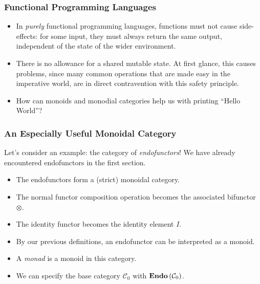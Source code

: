 \documentclass{beamer}
\numberwithin{figure}{section}
\DeclareMathOperator{\catendo}{\text{\textbf{Endo}}}
\begin{document}
\begin{frame}
        \frametitle{Functional Programming Languages}
        \begin{itemize}[<+->]
                \item In \textit{purely} functional programming languages,
                        functions must not cause side-effects: for some input,
                        they must always return the same output, independent of
                        the state of the wider environment.
                \item There is no allowance for a shared mutable state. At first
                        glance, this causes problems, since many common
                        operations that are made easy in the imperative world,
                        are in direct contravention with this safety principle.
                \item How can monoids and monodial categories help us with
                        printing ``Hello World''?
        \end{itemize}
\end{frame}

\begin{frame}
        \frametitle{An Especially Useful Monoidal Category}
        Let's consider an example: the category of \textit{endofunctors}! We
        have already encountered endofunctors in the first section.
        \begin{itemize}[<+->]
                \item The endofunctors form a (strict) monoidal category.
                \item The normal functor composition operation becomes the
                        associated bifunctor $\otimes$.
                \item The identity functor becomes the identity element $I$.
                \item By our previous definitions, an endofunctor can be
                        interpreted as a monoid.
                \item A \textit{monad} is a monoid in this category.
                \item We can specify the base category $\mathcal{C}_0$ with
                        $\catendo{(\mathcal{C}_0)}$.
        \end{itemize}
\end{frame}
\end{document}
